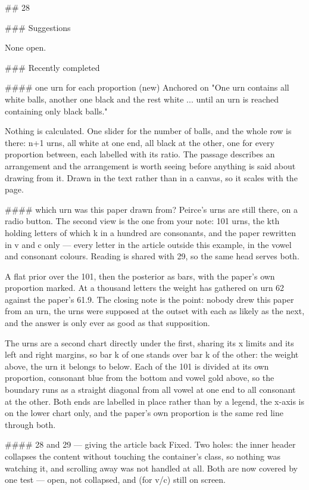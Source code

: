 ## 28

### Suggestions

None open.

### Recently completed

#### one urn for each proportion (new)
Anchored on "One urn contains all white balls, another one black and the rest
white ... until an urn is reached containing only black balls."

Nothing is calculated. One slider for the number of balls, and the whole row is
there: n+1 urns, all white at one end, all black at the other, one for every
proportion between, each labelled with its ratio. The passage describes an
arrangement and the arrangement is worth seeing before anything is said about
drawing from it. Drawn in the text rather than in a canvas, so it scales with
the page.

#### which urn was this paper drawn from?
Peirce's urns are still there, on a radio button. The second view is the one
from your note: 101 urns, the kth holding letters of which k in a hundred are
consonants, and the paper rewritten in v and c only — every letter in the
article outside this example, in the vowel and consonant colours. Reading is
shared with 29, so the same head serves both.

A flat prior over the 101, then the posterior as bars, with the paper's own
proportion marked. At a thousand letters the weight has gathered on urn 62
against the paper's 61.9. The closing note is the point: nobody drew this paper
from an urn, the urns were supposed at the outset with each as likely as the
next, and the answer is only ever as good as that supposition.

The urns are a second chart directly under the first, sharing its x limits and
its left and right margins, so bar k of one stands over bar k of the other: the
weight above, the urn it belongs to below. Each of the 101 is divided at its own
proportion, consonant blue from the bottom and vowel gold above, so the boundary
runs as a straight diagonal from all vowel at one end to all consonant at the
other. Both ends are labelled in place rather than by a legend, the x-axis is on
the lower chart only, and the paper's own proportion is the same red line
through both.

#### 28 and 29 — giving the article back
Fixed. Two holes: the inner header collapses the content without touching the
container's class, so nothing was watching it, and scrolling away was not
handled at all. Both are now covered by one test — open, not collapsed, and (for
v/c) still on screen.

